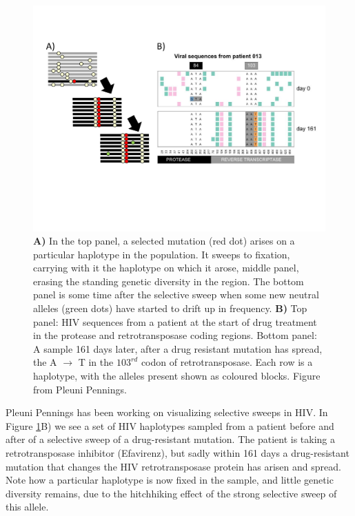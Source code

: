 \begin{figure}
\begin{center}
\includegraphics[width= \textwidth]{Journal_figs/recom_selection/Pleuni_HIV_sweep/HIV_no_recom_sweep.pdf}
\end{center}
\caption{{\bf A)} In the top panel, a selected mutation (red dot) arises
on a particular haplotype in the population. It sweeps to fixation,
carrying with it the haplotype on which it arose, middle panel,
erasing the standing genetic diversity in the region. The bottom panel
is some time after the selective sweep when some new neutral alleles (green
dots) have started to drift up in frequency. {\bf B)}  Top panel: HIV
sequences from a patient at the start of drug treatment in the
protease and retrotransposase coding regions. Bottom panel: A sample
161 days later, after a drug resistant mutation has spread, the A
$\rightarrow$ T in the $103^{rd}$ codon of retrotransposase. Each row is a haplotype,
with the alleles present shown as coloured blocks. Figure from Pleuni Pennings.} \label{fig:HIV_sweep}  %
\end{figure}

Pleuni Pennings has been working on visualizing selective sweeps in
HIV. In Figure \ref{fig:HIV_sweep}B) we see a set of HIV haplotypes
sampled from a patient before and after of a selective sweep of a
drug-resistant mutation. The patient is taking a
retrotransposase inhibitor (Efavirenz), but sadly within 161 days a
drug-resistant mutation that changes the HIV retrotransposase protein has arisen and spread. Note how a particular haplotype is now fixed in
the sample, and little genetic diversity remains, due to the
hitchhiking effect of the strong
selective sweep of this allele. 


